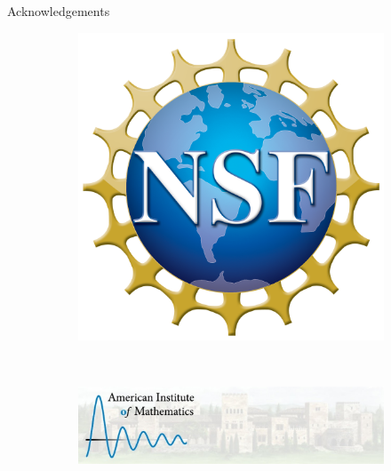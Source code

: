\documentclass[UKenglish]{beamer}
\begin{document}
\begin{frame}{Acknowledgements}
\begin{figure}
\begin{subfigure}[b]{0.3\textwidth}
         \includegraphics[width=\textwidth]{figures/nsf_logo.png}
     \end{subfigure}
     \\
     \vspace*{1cm}
     \begin{subfigure}[b]{0.8\textwidth}
         \centering
         \includegraphics[width=\textwidth]{figures/aim_logo.jpg}
     \end{subfigure}
\end{figure}
\vfill
\end{frame}
\end{document}
